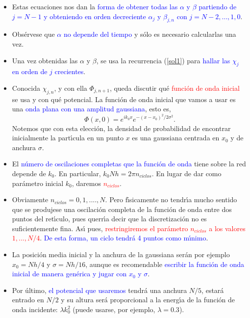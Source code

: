 \documentclass[12pt,spanish]{iopart}
\def\az{\textcolor{blue}}
\def\ro{\textcolor{red}}
\begin{document}
\begin{itemize}
\item Estas ecuaciones nos dan la \az{forma de obtener todas las $\alpha$ y $\beta$
partiendo de $j=N-1$ y obteniendo en orden decreciente $\alpha_{j}$ y
$\beta_{j,n}$ con  $j=N-2, \ldots,1,0$}. 

\item Obs\'ervese que \az{$\alpha$ no depende del tiempo} y s\'olo es necesario calcularlas una vez.

\item Una vez obtenidas las $\alpha$ y $\beta$, se usa la recurrencia (\ref{sol1}) para \az{hallar las $\chi_j$ en orden de $j$
crecientes}.

\item Conocida  $\chi_{j,n}$, y con ella $\Phi_{j,n+1}$, queda discutir qu\'e \ro{funci{\'o}n de onda inicial} se usa 
y con qu\'e potencial. La funci{\'o}n de onda inicial que vamos a usar es una \az{onda plana con una amplitud gaussiana}, esto es,
%
\begin{equation}
\Phi(x,0)=e^{ik_0x}e^{-(x-x_0)^2/2\sigma^2}.
\end{equation}
%
Notemos que con esta elecci{\'o}n, la densidad de  probabilidad de encontrar inicialmente la part{\'\i}cula en un punto $x$ es
una gaussiana centrada en $x_0$ y de anchura $\sigma$. 

\item El \az{n{\'u}mero de oscilaciones completas que la funci{\'o}n de onda} tiene
sobre la red depende de $k_0$. En particular, $k_0Nh=2\pi n_{ciclos}$. En lugar de dar como par{\'a}metro inicial $k_0$, daremos
\ro{$n_{ciclos}$}. 

\item Obviamente $n_{ciclos}=0,1,....,N$. Pero f{\'\i}sicamente no tendr{\'\i}a mucho sentido que se produjese una 
oscilaci{\'o}n completa de la funci{\'o}n de onda  entre dos puntos del ret{\'\i}culo, pues querr{\'\i}a decir que la
discretizaci\'on no es suficientemente fina. As\'{\i} pues, \ro{restringiremos el par{\'a}metro $n_{ciclos}$ a los valores 
$1,...,N/4$}. \az{De esta forma, un ciclo tendr\'a 4 puntos como m{\'\i}nimo}. 

\item La posici{\'o}n media inicial y la anchura de
la gaussiana ser\'an por ejemplo $x_0=Nh/4$ y  $\sigma=Nh/16$, aunque es recomendable \az{escribir la funci\'on de 
onda inicial de manera gen\'erica y jugar con $x_0$ y $\sigma$}.
 
\item Por {\'u}ltimo, \az{el potencial que usaremos} tendr\'a una anchura $N/5$, estar\'a entrado en $N/2$ y su altura ser\'a proporcional a 
la energ{\'\i}a de la funci{\'o}n de onda incidente: $\lambda k_0^2$ (puede usarse, por ejemplo, $\lambda=0.3$).


\end{itemize}
\end{document}
